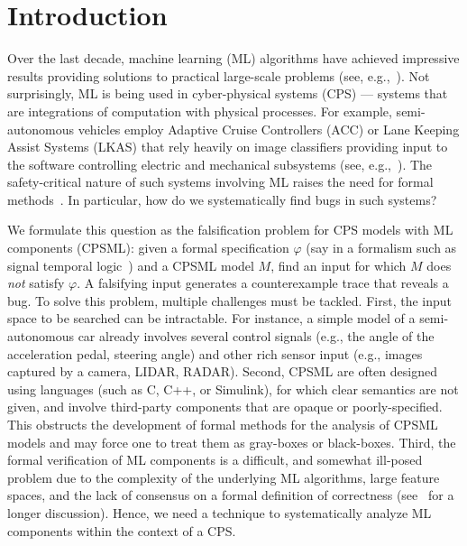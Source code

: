 \section{Introduction}\label{sec:introduction}

Over the last decade, machine learning (ML) algorithms have achieved impressive results providing solutions to practical large-scale
problems (see, e.g.,~\cite{blum1997selection,michalski2013machine,jia2014caffe,hinton2012deep}).
Not surprisingly, ML is being used in 
cyber-physical systems (CPS) --- systems that are integrations of
computation with physical processes. 
For example, semi-autonomous vehicles employ Adaptive Cruise Controllers (ACC)
or Lane Keeping Assist Systems (LKAS) that rely heavily on image classifiers
providing input to the software controlling electric and mechanical 
subsystems (see, e.g.,~\cite{nvidiaself-arxiv16}).
The safety-critical nature of such systems involving ML
raises the need for formal methods~\cite{SeshiaS16}.
In particular, how do we systematically find bugs in such systems?

We formulate this question as the falsification problem for CPS models with 
ML components (CPSML): given a formal specification $\varphi$ 
(say in a formalism such as signal temporal logic~\cite{maler2004monitoring}) 
and a CPSML model $M$, find an input for which $M$ does {\it not} satisfy $\varphi$. A falsifying 
input generates a counterexample trace that reveals a bug.
To solve this problem, multiple challenges must be tackled. 
First, the input space to be searched can be intractable.
For instance, a simple model of a semi-autonomous car already involves
several control signals (e.g., the angle of the acceleration pedal, steering angle) 
and other rich sensor input (e.g., images captured by a camera, LIDAR, RADAR). 
Second, CPSML are often designed using languages 
(such as C, C++, or Simulink), for which clear semantics are not given,
and involve third-party components that are opaque or poorly-specified. 
This obstructs the development of formal methods for the analysis 
of CPSML models and may force one 
to treat them as gray-boxes or black-boxes.
Third, the formal verification of ML components is a difficult,
and somewhat ill-posed problem due to
the complexity of the underlying ML algorithms,
large feature spaces, and the lack of consensus on a formal definition
of correctness (see~\cite{SeshiaS16} for a longer discussion). 
Hence, we need a technique 
to systematically analyze ML components within the context of a CPS.

